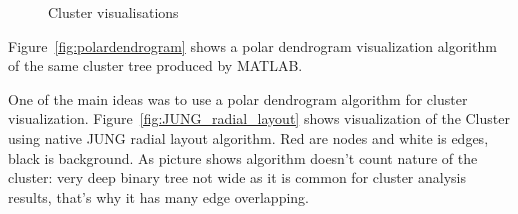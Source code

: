 \begin{figure}[h!]
\centering
{}
\label{fig:dendrograms}
\caption{Cluster visualisations}
\end{figure}


Figure~\ref{fig:polardendrogram} shows a polar dendrogram visualization algorithm of the same cluster tree produced by MATLAB.

One of the main ideas was to use a polar dendrogram algorithm for cluster visualization. Figure~\ref{fig:JUNG_radial_layout} shows visualization of the Cluster using native JUNG radial layout algorithm. Red are nodes and white is edges, black is background. As picture shows algorithm doesn't count nature of the cluster: very deep binary tree not wide as it is common for cluster analysis results, that's why it has many edge overlapping.


